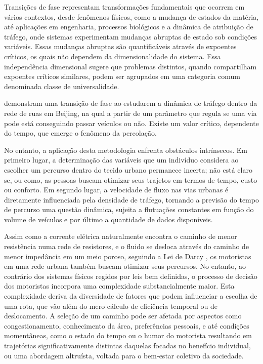 \documentclass{article}
\begin{document}

Transições de fase representam transformações fundamentais que ocorrem em vários contextos, desde fenômenos físicos, como a mudança de estados da matéria, até aplicações em engenharia, processos biológicos e a dinâmica de atribuição de tráfego, onde sistemas experimentam mudanças abruptas de estado sob condições variáveis. Essas mudanças abruptas são quantificáveis através de expoentes críticos, os quais não dependem da dimensionalidade do sistema. Essa independência dimensional sugere que problemas distintos, quando compartilham expoentes críticos similares, podem ser agrupados em uma categoria comum denominada classe de universalidade.

\citet{Li2014} demonstram uma transição de fase ao estudarem a dinâmica de tráfego dentro da rede de ruas em Beijing, na qual a partir de um parâmetro que regula se uma via pode está conseguindo passar veículos ou não. Existe um valor crítico, dependente do tempo, que emerge o fenômeno da percolação. \citet{Zeng2018}

No entanto, a aplicação desta metodologia enfrenta obstáculos intrínsecos. Em primeiro lugar, a determinação das variáveis que um indivíduo considera ao escolher um percurso dentro do tecido urbano permanece incerta; não está claro se, ou como, as pessoas buscam otimizar seus trajetos em termos de tempo, custo ou conforto. Em segundo lugar, a velocidade de fluxo nas vias urbanas é diretamente influenciada pela densidade de tráfego, tornando a previsão do tempo de percurso uma questão dinâmica, sujeita a flutuações constantes em função do volume de veículos e por último a quantidade de dados disponíveis.


Assim como a corrente elétrica naturalmente encontra o caminho de menor resistência numa rede de resistores, e o fluido se desloca através do caminho de menor impedância em um meio poroso, seguindo a Lei de Darcy \citep{darcy}, os motoristas em uma rede urbana também buscam otimizar seus percursos. No entanto, ao contrário dos sistemas físicos regidos por leis bem definidas, o processo de decisão dos motoristas incorpora uma complexidade substancialmente maior. Esta complexidade deriva da diversidade de fatores que podem influenciar a escolha de uma rota, que vão além do mero cálculo de eficiência temporal ou de deslocamento. A seleção de um caminho pode ser afetada por aspectos como congestionamento, conhecimento da área, preferências pessoais, e até condições momentâneas, como o estado do tempo ou o humor do motorista resultando em trajetórias significativamente distintas daquelas focadas no benefício individual, ou uma abordagem altruísta, voltada para o bem-estar coletivo da sociedade.
\end{document}
